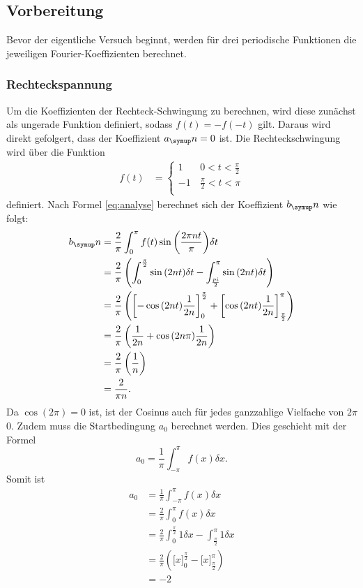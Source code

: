 \subsection{Vorbereitung}
Bevor der eigentliche Versuch beginnt, werden für drei periodische Funktionen
die jeweiligen Fourier-Koeffizienten berechnet.
\subsubsection{Rechteckspannung}
Um die Koeffizienten der Rechteck-Schwingung zu berechnen, wird diese zunächst
als ungerade Funktion definiert, sodass $f(t)=-f(-t)$ gilt. Daraus wird direkt
gefolgert, dass der Koeffizient $a_\su{n}=0$ ist.
Die Rechteckschwingung wird über die Funktion
  \begin{align}
  f(t)&=
  \begin{cases}
    1 & \, 0<t<\frac{\pi}{2} \\
    -1& \, \frac{\pi}{2}<t<\pi \\
  \end{cases}
\end{align}
definiert. Nach Formel \eqref{eq:analyse} berechnet sich der Koeffizient $b_\su{n}$
wie folgt:
\begin{align*}
  b_\su{n} &= \frac{2}{\pi}\int^\pi_0{f(t)\sin{\left(\frac{2\pi n t}{\pi}\right)}\delta t} \\
  &= \frac{2}{\pi}\left(\int_0^{\frac{\pi}{2}}{\sin{(2nt)}\delta t} -
  \int_{\frac{pi}{2}}^\pi{\sin{(2nt)}\delta t}\right) \\
  &= \frac{2}{\pi}\left(\left[-\cos{(2nt)}\frac{1}{2n}\right]_0^{\frac{\pi}{2}} +
  \left[\cos{(2nt)}\frac{1}{2n}\right]_{\frac{\pi}{2}}^\pi\right) \\
  &= \frac{2}{\pi}\left(\frac{1}{2n}+\cos{(2n\pi)}\frac{1}{2n}\right) \\
  &= \frac{2}{\pi}\left(\frac{1}{n}\right) \\
  &= \frac{2}{\pi n}.
\end{align*}
Da $\cos{(2\pi)}=0$ ist, ist der Cosinus auch für jedes ganzzahlige Vielfache von
$2\pi$ 0.
Zudem muss die Startbedingung $a_0$ berechnet werden. Dies geschieht mit der
Formel
\begin{equation*}
  a_0 = \frac{1}{\pi}\int_{-\pi}^\pi{f(x)\delta x}.
\end{equation*}
Somit ist
\begin{align*}
  a_0 &= \frac{1}{\pi}\int_{-\pi}^\pi{f(x)\delta x} \\
  &= \frac{2}{\pi}\int_0^{\pi}{f(x)\delta x} \\
  &= \frac{2}{\pi}\int_0^{\frac{\pi}{2}}{1\delta x} -
  \int^\pi_{\frac{\pi}{2}}{1\delta x} \\
  &= \frac{2}{\pi}\left(\biggl[x\biggr]_0^{\frac{\pi}{2}} -
  \biggl[x\biggr]_{\frac{\pi}{2}}^\pi\right) \\
  &= -2
\end{align*}
